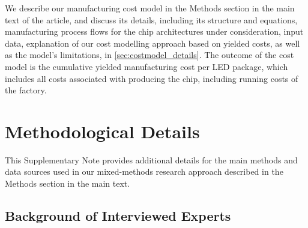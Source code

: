 \documentclass[parskip=full]{article}
\begin{document}
We describe our manufacturing cost model in the Methods section in the main text of the article, and discuss its details, including its structure and equations, manufacturing process flows for the chip architectures under consideration, input data, explanation of our cost modelling approach based on yielded costs, as well as the model’s limitations, in \cref{sec:costmodel_details}. The outcome of the cost model is the cumulative yielded manufacturing cost per LED package, which includes all costs associated with producing the chip, including running costs of the factory.

\clearpage
\section{Methodological Details}
\label{sec:method_details}

This Supplementary Note provides additional details for the main methods and data sources used in our mixed-methods research approach described in the Methods section in the main text.

\subsection{Background of Interviewed Experts}
\end{document}

